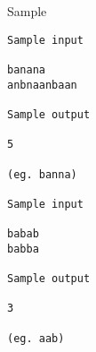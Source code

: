 Sample
\begin{verbatim}
Sample input
 
banana 
anbnaanbaan 
 
Sample output
 
5 
 
(eg. banna) 

Sample input
 
babab 
babba 
 
Sample output
 
3 
 
(eg. aab) 
\end{verbatim}